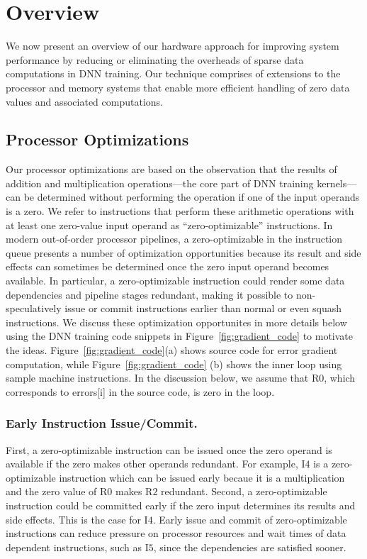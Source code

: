 \section{Overview}
\label{sec:overview}

We now present an overview of our hardware approach for improving system performance by reducing or eliminating the overheads of sparse data computations in DNN training. Our technique comprises of extensions to the processor and memory systems that enable more efficient handling of zero data values and associated computations.  

\subsection{Processor Optimizations}
Our processor optimizations are based on the observation that the results of addition and multiplication operations---the core part of DNN training kernels---can be determined without performing the operation if one of the input operands is a zero.  We refer to instructions that perform these arithmetic operations with at least one zero-value input operand as ``zero-optimizable'' instructions.  In modern out-of-order processor pipelines, a zero-optimizable in the instruction queue presents a number of optimization opportunities because its result and side effects can sometimes be determined once the zero input operand becomes available. In particular, a zero-optimizable instruction could render some data dependencies and pipeline stages redundant, making it possible to non-speculatively issue or commit instructions earlier than normal or even squash instructions. We discuss these optimization opportunites in more details below using the DNN training code snippets in Figure~\ref{fig:gradient_code} to motivate the ideas.  Figure~\ref{fig:gradient_code}(a)  shows source code for error gradient computation, while Figure~\ref{fig:gradient_code} (b) shows the inner loop using sample machine instructions.  In the discussion below, we  assume that R$0$, which corresponds to errors[i] in the source code,  is zero in the loop. 

\subsubsection{Early Instruction Issue/Commit.}  First, a zero-optimizable instruction can be issued once the zero operand is available if the zero makes other operands redundant.  For example, I$4$ is a zero-optimizable instruction which can be issued early becaue it is a multiplication and the zero value of R$0$ makes R$2$ redundant.  Second, a zero-optimizable instruction could be committed early if the zero input determines its results and side effects. This is the case for I$4$. Early issue and commit of zero-optimizable instructions can reduce pressure on processor resources and wait times of data dependent instructions, such as I$5$, since the dependencies are satisfied sooner. 

